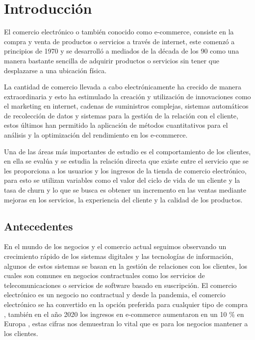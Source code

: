 \chapter{Introducción}

El comercio electrónico o también conocido como e-commerce, consiste en la compra y venta de productos o servicios a través de internet, este comenzó a principios de 1970 y se desarrolló a mediados de la década de los 90 como una manera bastante sencilla de adquirir productos o servicios sin tener que desplazarse a una ubicación física.

La cantidad de comercio llevada a cabo electrónicamente ha crecido de manera extraordinaria y esto ha estimulado la creación y utilización de innovaciones como el marketing en internet, cadenas de suministros complejas, sistemas automáticos de recolección de datos y sistemas para la gestión de la relación con el cliente, estos últimos han permitido la aplicación de métodos cuantitativos para el análisis y la optimización del rendimiento en los e-commerce.

Una de las áreas más importantes de estudio es el comportamiento de los clientes, en ella se evalúa y se estudia la relación directa que existe entre el servicio que se les proporciona a los usuarios y los ingresos de la tienda de comercio electrónico, para esto se utilizan variables como el valor del ciclo de vida de un cliente y la tasa de churn y lo que se busca es obtener un incremento en las ventas mediante mejoras en los servicios, la experiencia del cliente y la calidad de los productos.

\section{Antecedentes}

En el mundo de los negocios y el comercio actual seguimos observando un crecimiento rápido de los sistemas digitales y las tecnologías de información, algunos de estos sistemas se basan en la gestión de relaciones con los clientes, los cuales son comunes en negocios contractuales como los servicios de telecomunicaciones o servicios de software basado en suscripción. El comercio electrónico es un negocio no contractual y desde la pandemia, el comercio electrónico se ha convertido en la opción preferida para cualquier tipo de compra \cite{paraschiv2022}, también en el año 2020 los ingresos en e-commerce aumentaron en un 10 \% en Europa \citep{jilkova2021}, estas cifras nos demuestran lo vital que es para los negocios mantener a los clientes.


